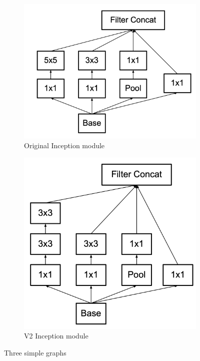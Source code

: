 \documentclass[conference]{IEEEtran}
\begin{document}
\begin{figure}[!htbp]
     \centering
     \begin{subfigure}[b]{0.25\textwidth}
         \centering
         \includegraphics[width=\textwidth]{img/inceptionv1.png}
         \caption{Original Inception module \cite{szegedy_going_2014}}
         \label{fig:x inception module 5x5}
     \end{subfigure}
     \hfill
     \begin{subfigure}[b]{0.22\textwidth}
         \centering
         \includegraphics[width=\textwidth]{img/incetionv2.png}
         \caption{V2 Inception module \cite{szegedy_rethinking_2015}}
         \label{fig:x inception module 3x3}
     \end{subfigure}
        \caption{Three simple graphs}
        \label{fig:three graphs}
\end{figure}
\end{document}
